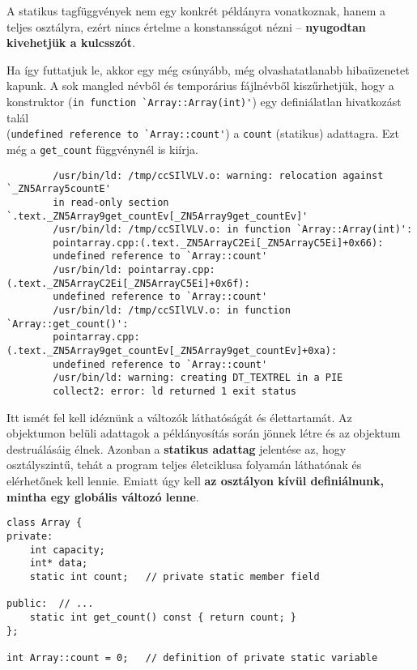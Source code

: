 \documentclass[a4paper, 11pt, oneside]{book}
\makeatletter
\newcommand{\verbatimfontsize}{\small\verbatim@font}
\makeatother
\begin{document}
A statikus tagfüggvények nem egy konkrét példányra vonatkoznak, hanem a teljes osztályra, ezért nincs értelme a konstansságot nézni -- \textbf{nyugodtan kivehetjük a kulcsszót}.

Ha így futtatjuk le, akkor egy még csúnyább, még olvashatatlanabb hibaüzenetet kapunk. A sok mangled névből és temporárius fájlnévből kiszűrhetjük, hogy a konstruktor (\verb|in function `Array::Array(int)'|) egy definiálatlan hivatkozást talál \\ (\verb|undefined reference to `Array::count'|) a \verb*|count| (statikus) adattagra. Ezt még a \verb*|get_count| függvénynél is kiírja.

\begin{framed}
	\verbatimfontsize
	\begin{verbatim}
		/usr/bin/ld: /tmp/ccSIlVLV.o: warning: relocation against `_ZN5Array5countE' 
		in read-only section `.text._ZN5Array9get_countEv[_ZN5Array9get_countEv]'
		/usr/bin/ld: /tmp/ccSIlVLV.o: in function `Array::Array(int)':
		pointarray.cpp:(.text._ZN5ArrayC2Ei[_ZN5ArrayC5Ei]+0x66): 
		undefined reference to `Array::count'
		/usr/bin/ld: pointarray.cpp:(.text._ZN5ArrayC2Ei[_ZN5ArrayC5Ei]+0x6f): 
		undefined reference to `Array::count'
		/usr/bin/ld: /tmp/ccSIlVLV.o: in function `Array::get_count()':
		pointarray.cpp:(.text._ZN5Array9get_countEv[_ZN5Array9get_countEv]+0xa): 
		undefined reference to `Array::count'
		/usr/bin/ld: warning: creating DT_TEXTREL in a PIE
		collect2: error: ld returned 1 exit status
	\end{verbatim}
\end{framed}

Itt ismét fel kell idéznünk a változók láthatóságát és élettartamát. Az objektumon belüli adattagok a példányosítás során jönnek létre és az objektum destruálásáig élnek. Azonban a \textbf{statikus adattag} jelentése az, hogy osztályszintű, tehát a program teljes életciklusa folyamán láthatónak és elérhetőnek kell lennie. Emiatt úgy kell \textbf{az osztályon kívül definiálnunk, mintha egy globális változó lenne}.

\begin{lstlisting}[style=cppstyle]
class Array {
private:
	int capacity;
	int* data;
	static int count;	// private static member field
		
public:  // ...
	static int get_count() const { return count; }
};

int Array::count = 0;	// definition of private static variable
\end{lstlisting}
\end{document}
